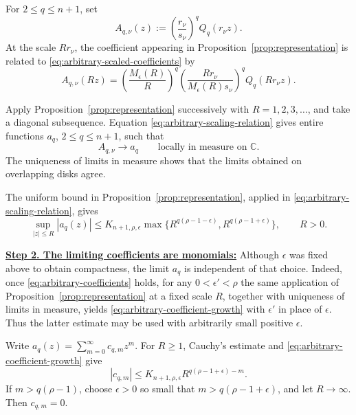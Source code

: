 \documentclass[12pt,letterpaper,reqno]{amsart}
\theoremstyle{definition}
\numberwithin{equation}{section}
\newcommand{\C}{\mathbb C}
\begin{document}
For \(2\leq q\leq n+1\), set
\begin{equation}\label{eq:arbitrary-scaled-coefficients}
 A_{q,\nu}(z)
 :=
 \left(\frac{r_\nu}{s_\nu}\right)^q
 Q_q(r_\nu z).
\end{equation}
At the scale \(Rr_\nu\), the coefficient appearing in
Proposition~\ref{prop:representation} is related to
\eqref{eq:arbitrary-scaled-coefficients} by
\begin{equation}\label{eq:arbitrary-scaling-relation}
 A_{q,\nu}(Rz)
 =
 \left(\frac{M_\epsilon(R)}{R}\right)^q
 \left(
 \frac{Rr_\nu}{M_\epsilon(R)s_\nu}
 \right)^q
 Q_q(Rr_\nu z).
\end{equation}

Apply Proposition~\ref{prop:representation} successively with
\(R=1,2,3,\ldots\), and take a diagonal subsequence. Equation
\eqref{eq:arbitrary-scaling-relation} gives entire functions
\(a_q\), \(2\leq q\leq n+1\), such that
\begin{equation}\label{eq:arbitrary-coefficients}
 A_{q,\nu}\longrightarrow a_q
 \qquad\text{locally in measure on }\C.
\end{equation}
The uniqueness of limits in measure shows that the limits obtained on
overlapping disks agree.

The uniform bound in
Proposition~\ref{prop:representation}, applied in
\eqref{eq:arbitrary-scaling-relation}, gives
\begin{equation}\label{eq:arbitrary-coefficient-growth}
 \sup_{|z|\leq R}|a_q(z)|
 \leq
 K_{{n+1},\rho,\epsilon}
 \max\{
 R^{q(\rho-1-\epsilon)},
 R^{q(\rho-1+\epsilon)}
 \},
 \qquad R>0.
\end{equation}


\medskip\noindent
\textbf{\underline{Step 2. The limiting coefficients are monomials:}}
Although \(\epsilon\) was fixed above to obtain compactness, the limit
\(a_q\) is independent of that choice. Indeed, once
\eqref{eq:arbitrary-coefficients} holds, for any
\(0<\epsilon'<\rho\) the same application of
Proposition~\ref{prop:representation} at a fixed scale \(R\), together with
uniqueness of limits in measure, yields
\eqref{eq:arbitrary-coefficient-growth} with \(\epsilon'\) in place of
\(\epsilon\). Thus the latter estimate may be used with arbitrarily small
positive \(\epsilon\).

Write
\(a_q(z)=\sum_{m=0}^{\infty}c_{q,m}z^m\).
For \(R\geq1\), Cauchy's estimate and
\eqref{eq:arbitrary-coefficient-growth} give
\[
|c_{q,m}|
\leq
K_{{n+1},\rho,\epsilon}
R^{q(\rho-1+\epsilon)-m}.
\]
If \(m>q(\rho-1)\), choose \(\epsilon>0\) so small that
\(m>q(\rho-1+\epsilon)\), and let \(R\to\infty\). Then
\(c_{q,m}=0\).
\end{document}
